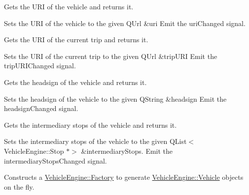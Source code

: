 Gets the U\+RI of the vehicle and returns it.

Sets the U\+RI of the vehicle to the given Q\+Url \&uri Emit the uri\+Changed signal.

Gets the U\+RI of the current trip and returns it.

Sets the U\+RI of the current trip to the given Q\+Url \&trip\+U\+RI Emit the trip\+U\+R\+I\+Changed signal.

Gets the headsign of the vehicle and returns it.

Sets the headsign of the vehicle to the given Q\+String \&headsign Emit the headsign\+Changed signal.

Gets the intermediary stops of the vehicle and returns it.

Sets the intermediary stops of the vehicle to the given Q\+List$<$\+Vehicle\+Engine\+::\+Stop $\ast$$>$ \&intermediary\+Stops. Emit the intermediary\+Stops\+Changed signal.

Constructs a \mbox{\hyperlink{classVehicleEngine_1_1Factory}{Vehicle\+Engine\+::\+Factory}} to generate \mbox{\hyperlink{classVehicleEngine_1_1Vehicle}{Vehicle\+Engine\+::\+Vehicle}} objects on the fly. 